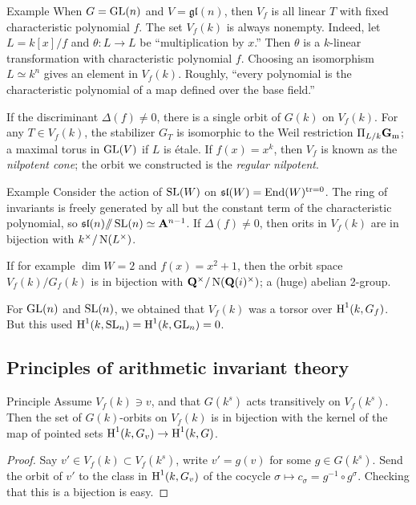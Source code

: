 \begin{enonce}[remark]{Example}
When $G=\operatorname{GL}(n)$ and $V=\mathfrak{gl}(n)$, then $V_f$ is all linear 
$T$ with fixed characteristic polynomial $f$. The set $V_f(k)$ is always 
nonempty. Indeed, let $L=k[x]/f$ and $\theta:L\to L$ be ``multiplication 
by $x$.'' Then $\theta$ is a $k$-linear transformation with characteristic 
polynomial $f$. Choosing an isomorphism $L\simeq k^n$ gives an element in 
$V_f(k)$. Roughly, ``every polynomial is the characteristic polynomial of a 
map defined over the base field.'' 

If the discriminant $\Delta(f)\ne 0$, there 
is a single orbit of $G(k)$ on $V_f(k)$. For any $T\in V_f(k)$, 
the stabilizer $G_T$ is isomorphic to the Weil restriction 
$\Pi_{L/k}\mathbf{G}_{\mathrm{m}}$; a maximal torus in $\operatorname{GL}(V)$ if $L$ 
is \'etale. 
If $f(x)=x^k$, then $V_f$ is known as the \emph{nilpotent cone}; the orbit 
we constructed is the \emph{regular nilpotent}. 
\end{enonce}

\begin{enonce}[remark]{Example}
Consider the action of $\operatorname{SL}(W)$ on 
$\mathfrak{sl}(W)=\operatorname{End}(W)^{\operatorname{tr}=0}$. The ring of invariants is freely 
generated by all but the constant term of the characteristic polynomial, so 
$\mathfrak{sl}(n)/\!\!/ \operatorname{SL}(n) \simeq \mathbf{A}^{n-1}$. If $\Delta(f)\ne 0$, 
then orits in $V_f(k)$ are in bijection with $k^\times / \operatorname{N}(L^\times)$. 

If for example $\dim W=2$ and $f(x)=x^2+1$, then the orbit space 
$V_f(k)/G_f(k)$ is in bijection with $\mathbf{Q}^\times/\operatorname{N}(\mathbf{Q}(i)^\times)$; a 
(huge) abelian 2-group. 
\end{enonce}

For $\operatorname{GL}(n)$ and $\operatorname{SL}(n)$, we obtained that 
$V_f(k)$ was a torsor over $\operatorname{H}^1(k,G_f)$. But this used 
$\operatorname{H}^1(k,\operatorname{SL}_n) = \operatorname{H}^1(k,\operatorname{GL}_n) = 0$. 





\subsection{Principles of arithmetic invariant theory}

\begin{enonce}{Principle}
Assume $V_f(k)\ni v$, and that $G(k^s)$ acts transitively on 
$V_f(k^s)$. Then the set of $G(k)$-orbits on $V_f(k)$ is in bijection with the 
kernel of the map of pointed sets 
$\operatorname{H}^1(k,G_v) \to \operatorname{H}^1(k,G)$. 
\end{enonce}
\begin{proof}
Say $v'\in V_f(k)\subset V_f(k^s)$, write $v'=g(v)$ for some $g\in G(k^s)$. 
Send the orbit of $v'$ to the class in $\operatorname{H}^1(k,G_v)$ of the cocycle 
$\sigma\mapsto c_\sigma = g^{-1} \circ g^\sigma$. Checking that this is a 
bijection is easy. 
\end{proof}

